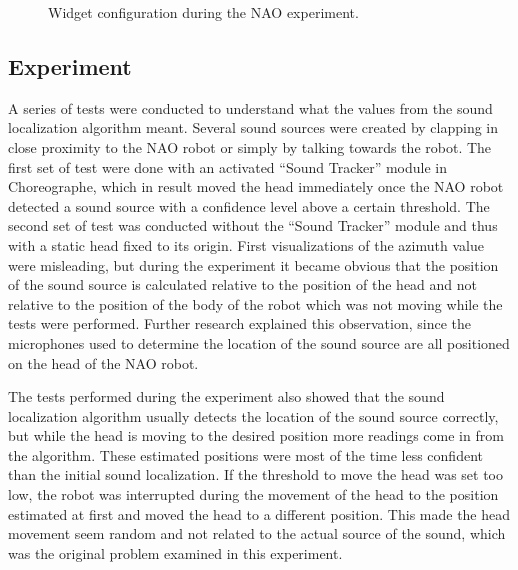 \begin{figure}[htpb]
  \centering
  \caption{Widget configuration during the NAO experiment.}
  \label{nao_dashboard_screenshot}
\end{figure}

\subsection{Experiment}
A series of tests were conducted to understand what the values from the sound localization algorithm meant. Several sound sources were created by clapping in close proximity to the NAO robot or simply by talking towards the robot. The first set of test were done with an activated ``Sound Tracker'' module in Choreographe, which in result moved the head immediately once the NAO robot detected a sound source with a confidence level above a certain threshold. The second set of test was conducted without the ``Sound Tracker'' module and thus with a static head fixed to its origin. First visualizations of the azimuth value were misleading, but during the experiment it became obvious that the position of the sound source is calculated relative to the position of the head and not relative to the position of the body of the robot which was not moving while the tests were performed. Further research explained this observation, since the microphones used to determine the location of the sound source are all positioned on the head of the NAO robot.

The tests performed during the experiment also showed that the sound localization algorithm usually detects the location of the sound source correctly, but while the head is moving to the desired position more readings come in from the algorithm. These estimated positions were most of the time less confident than the initial sound localization. If the threshold to move the head was set too low, the robot was interrupted during the movement of the head to the position estimated at first and moved the head to a different position. This made the head movement seem random and not related to the actual source of the sound, which was the original problem examined in this experiment.

